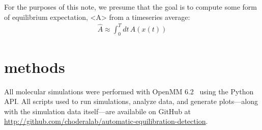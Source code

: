 \documentclass[aps,pre,twocolumn,nofootinbib,superscriptaddress,linenumbers]{revtex4-1}
\begin{document}
For the purposes of this note, we presume that the goal is to compute some form of equilibrium expectation, <A> from a timeseries average:
\begin{eqnarray}
\hat{A} \approx \int_0^T dt \, A(x(t))
\end{eqnarray}


\begin{figure*} 
\caption{\label{figure:burn-in-example} {\bf Illustration of the motivation for discarding data to equilibration in computing expectations from molecular simulations.} 
This is text.}
\end{figure*}


\section*{methods}
\label{section:methods}

All molecular simulations were performed with OpenMM 6.2~\cite{eastman:jctc:2012:openmm} using the Python API.
All scripts used to run simulations, analyze data, and generate plots---along with the simulation data itself---are availabile on GitHub at \url{http://github.com/choderalab/automatic-equilibration-detection}.



 

\end{document}
